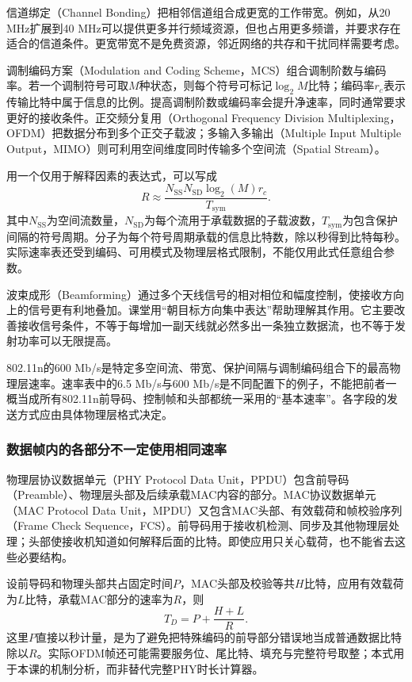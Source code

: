 信道绑定（Channel Bonding）把相邻信道组合成更宽的工作带宽。例如，从20 MHz扩展到40 MHz可以提供更多并行频域资源，但也占用更多频谱，并要求存在适合的信道条件。更宽带宽不是免费资源，邻近网络的共存和干扰同样需要考虑。

调制编码方案（Modulation and Coding Scheme，MCS）组合调制阶数与编码率。若一个调制符号可取$M$种状态，则每个符号可标记$\log_2 M$比特；编码率$r_c$表示传输比特中属于信息的比例。提高调制阶数或编码率会提升净速率，同时通常要求更好的接收条件。正交频分复用（Orthogonal Frequency Division Multiplexing，OFDM）把数据分布到多个正交子载波；多输入多输出（Multiple Input Multiple Output，MIMO）则可利用空间维度同时传输多个空间流（Spatial Stream）。

用一个仅用于解释因素的表达式，可以写成
\begin{equation}
R\approx\frac{N_{\mathrm{SS}}N_{\mathrm{SD}}\log_2(M)r_c}{T_{\mathrm{sym}}}.
\end{equation}
其中$N_{\mathrm{SS}}$为空间流数量，$N_{\mathrm{SD}}$为每个流用于承载数据的子载波数，$T_{\mathrm{sym}}$为包含保护间隔的符号周期。分子为每个符号周期承载的信息比特数，除以秒得到比特每秒。实际速率表还受到编码、可用模式及物理层格式限制，不能仅用此式任意组合参数。

波束成形（Beamforming）通过多个天线信号的相对相位和幅度控制，使接收方向上的信号更有利地叠加。课堂用“朝目标方向集中表达”帮助理解其作用。它主要改善接收信号条件，不等于每增加一副天线就必然多出一条独立数据流，也不等于发射功率可以无限提高。

802.11n的600 Mb/s是特定多空间流、带宽、保护间隔与调制编码组合下的最高物理层速率。速率表中的6.5 Mb/s与600 Mb/s是不同配置下的例子，不能把前者一概当成所有802.11n前导码、控制帧和头部都统一采用的“基本速率”。各字段的发送方式应由具体物理层格式决定。

\subsubsection{数据帧内的各部分不一定使用相同速率}

物理层协议数据单元（PHY Protocol Data Unit，PPDU）包含前导码（Preamble）、物理层头部及后续承载MAC内容的部分。MAC协议数据单元（MAC Protocol Data Unit，MPDU）又包含MAC头部、有效载荷和帧校验序列（Frame Check Sequence，FCS）。前导码用于接收机检测、同步及其他物理层处理；头部使接收机知道如何解释后面的比特。即使应用只关心载荷，也不能省去这些必要结构。

设前导码和物理头部共占固定时间$P$，MAC头部及校验等共$H$比特，应用有效载荷为$L$比特，承载MAC部分的速率为$R$，则
\begin{equation}
T_D=P+\frac{H+L}{R}.
\end{equation}
这里$P$直接以秒计量，是为了避免把特殊编码的前导部分错误地当成普通数据比特除以$R$。实际OFDM帧还可能需要服务位、尾比特、填充与完整符号取整；本式用于本课的机制分析，而非替代完整PHY时长计算器。

